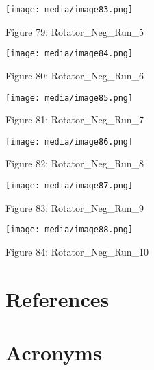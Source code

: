 \documentclass[SE,lsstdraft,authoryear,toc]{lsstdoc}
\begin{document}
\texttt{[image: media/image83.png]}

Figure 79: Rotator\_Neg\_Run\_5

\texttt{[image: media/image84.png]}

Figure 80: Rotator\_Neg\_Run\_6

\texttt{[image: media/image85.png]}

Figure 81: Rotator\_Neg\_Run\_7

\texttt{[image: media/image86.png]}

Figure 82: Rotator\_Neg\_Run\_8

\texttt{[image: media/image87.png]}

Figure 83: Rotator\_Neg\_Run\_9

\texttt{[image: media/image88.png]}

Figure 84: Rotator\_Neg\_Run\_10

\appendix
\section{References} \label{sec:bib}
\renewcommand{\refname}{} %


\section{Acronyms} \label{sec:acronyms}

\end{document}
